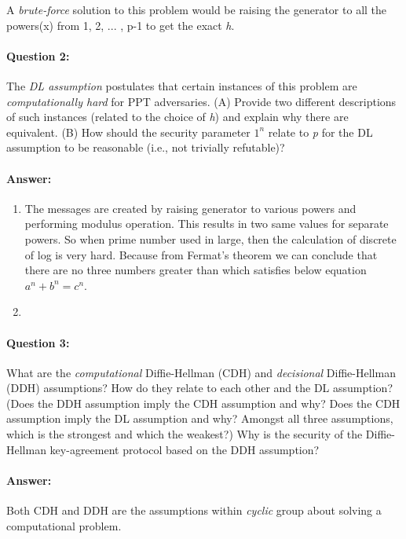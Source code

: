 \documentclass{article}
\begin{document}
        A \emph{brute-force} solution to this problem would be raising the generator to all the powers(x) from 1, 2, ... , p-1 to get the exact \emph{h}. 
        
    \paragraph{Question 2:} The \emph{DL assumption} postulates that certain instances of this problem are \emph{computationally hard} for PPT adversaries. (A) Provide two different descriptions of such instances (related to the choice of \emph{h}) and explain why there are equivalent. (B) How should the security parameter $1^n$ relate to \emph{p} for the DL assumption to be reasonable (i.e., not trivially refutable)?
    \paragraph{Answer: \newline}
        \begin{enumerate}
            \item The messages are created by raising generator to various powers and performing modulus operation. This results in two same values for separate powers. So when prime number used in large, then the calculation of discrete of log is very hard. Because from Fermat's theorem we can conclude that there are no three numbers greater than which satisfies below equation $a^n + b^n = c^n$.
            \item 
        \end{enumerate}
        
    \paragraph{Question 3:} What are the \emph{computational} Diffie-Hellman (CDH) and \emph{decisional} Diffie-Hellman (DDH) assumptions? How do they relate to each other and the DL assumption? (Does the DDH assumption imply the CDH assumption and why? Does the CDH assumption imply the DL assumption and why? Amongst all three assumptions, which is the strongest and which the weakest?) Why is the security of the Diffie-Hellman key-agreement protocol based on the DDH assumption?
    \paragraph{Answer: \newline}
        Both CDH and DDH are the assumptions within \emph{cyclic} group about solving a computational problem. \newline
        
\end{document}
